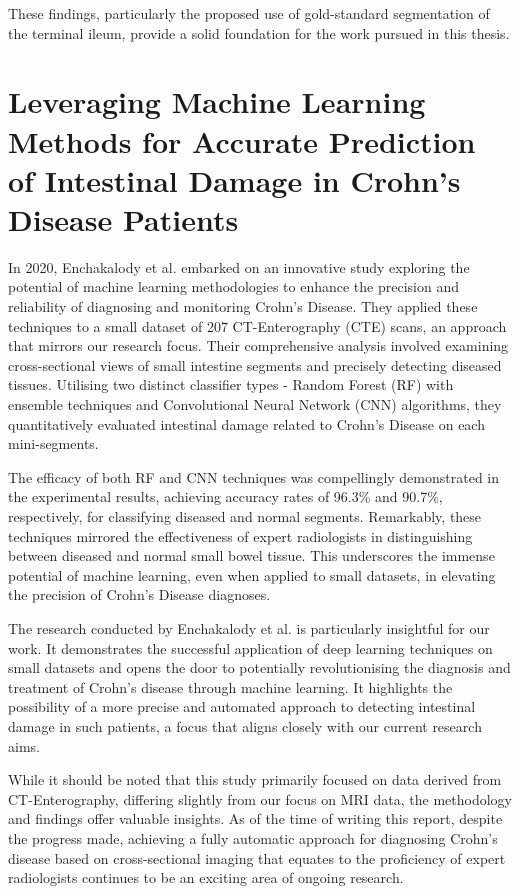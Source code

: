 These findings, particularly the proposed use of gold-standard segmentation of the terminal ileum, provide a solid foundation for the work pursued in this thesis.

\section{Leveraging Machine Learning Methods for Accurate Prediction of Intestinal Damage in Crohn's Disease Patients}

In 2020, Enchakalody et al. \cite{enchakalody2020machine} embarked on an innovative study exploring the potential of machine learning methodologies to enhance the precision and reliability of diagnosing and monitoring Crohn's Disease. They applied these techniques to a small dataset of 207 CT-Enterography (CTE) scans, an approach that mirrors our research focus. Their comprehensive analysis involved examining cross-sectional views of small intestine segments and precisely detecting diseased tissues. Utilising two distinct classifier types - Random Forest (RF) with ensemble techniques and Convolutional Neural Network (CNN) algorithms, they quantitatively evaluated intestinal damage related to Crohn's Disease on each mini-segments.

The efficacy of both RF and CNN techniques was compellingly demonstrated in the experimental results, achieving accuracy rates of 96.3\% and 90.7\%, respectively, for classifying diseased and normal segments. Remarkably, these techniques mirrored the effectiveness of expert radiologists in distinguishing between diseased and normal small bowel tissue. This underscores the immense potential of machine learning, even when applied to small datasets, in elevating the precision of Crohn's Disease diagnoses.

The research conducted by Enchakalody et al. is particularly insightful for our work. It demonstrates the successful application of deep learning techniques on small datasets and opens the door to potentially revolutionising the diagnosis and treatment of Crohn's disease through machine learning. It highlights the possibility of a more precise and automated approach to detecting intestinal damage in such patients, a focus that aligns closely with our current research aims.

While it should be noted that this study primarily focused on data derived from CT-Enterography, differing slightly from our focus on MRI data, the methodology and findings offer valuable insights. As of the time of writing this report, despite the progress made, achieving a fully automatic approach for diagnosing Crohn's disease based on cross-sectional imaging that equates to the proficiency of expert radiologists continues to be an exciting area of ongoing research.